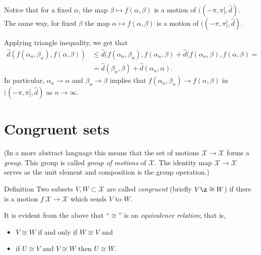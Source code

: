 { 
Notice that for a fixed $\alpha$,
 the map $\beta\mapsto f(\alpha,\beta)$ is a motion of $((-\pi,\pi],\hat d)$.
The same way, for fixed $\beta$ the map $\alpha\mapsto f(\alpha,\beta)$ is a motion of $((-\pi,\pi],\hat d)$.

Applying triangle inequality, we get that
\begin{align*}
\hat d(f(\alpha_n,\beta_n),f(\alpha,\beta))
&\le\hat d(f(\alpha_n,\beta_n),f(\alpha_n,\beta)
+
\hat d(f(\alpha_n,\beta),f(\alpha,\beta)
=
\\
&=
\hat d(\beta_n,\beta)+\hat d(\alpha_n,\alpha).
\end{align*}
In particular, $\alpha_n\to\alpha$ and $\beta_n\to \beta$
implies that $f(\alpha_n,\beta_n)\to f(\alpha,\beta)$
in $((-\pi,\pi],\hat d)$ as $n\to\infty$.














\section*{Congruent sets}



(In a more abstract language this means that  the set of motions $\mathcal X\to\mathcal X$ forms a {}\emph{group}.
This group is called \emph{group of motions} of $\mathcal X$.
The identity map $\mathcal X\to\mathcal X$ serves as the unit element  and composition is the group operation.)

\begin{thm}{Definition}
Two subsets $V,W\subset \mathcal X$ are called \emph{congruent} (briefly \index{$\cong$}$V\z\cong W$)
if there is a motion $f\:\mathcal X\to\mathcal X$ which sends $V$ to $W$.
\end{thm}

It is evident from the above that ``$\cong$'' is an  \emph{equivalence relation};
that is, 
\begin{itemize}
\item $V\cong W$ if and only if $W\cong V$ and 
\item if $U\cong V$ and $V\cong W$ then $U\cong W$.
\end{itemize}


}
